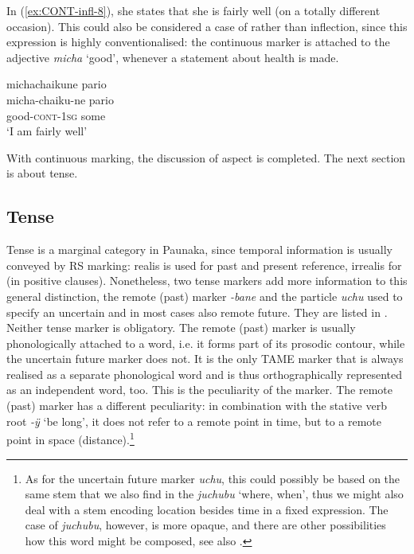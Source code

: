 In (\ref{ex:CONT-infl-8}), she states that she is fairly well (on a totally different occasion). This could also be considered a case of  rather than inflection, since this expression is highly conventionalised: the continuous marker is attached to the adjective \textit{micha} ‘good’, whenever a statement about health is made.

\ea\label{ex:CONT-infl-8}
\begingl
\glpreamble michachaikune pario\\
\gla micha-chaiku-ne pario\\
\glb good-\textsc{cont}-1\textsc{sg} some\\
\glft ‘I am fairly well’
\endgl
\trailingcitation{[cux-120410ls.020]}
\xe

With continuous marking, the discussion of aspect is completed. The next section is about tense.

\subsection{Tense}\label{sec:Tense}
\largerpage[-1]
Tense is a marginal category in Paunaka, since temporal information is usually conveyed by RS marking: realis is used for past and present reference, irrealis for  (in positive clauses). Nonetheless, two tense markers add more information to this general distinction, the remote (past) marker \textit{-bane} and the particle \textit{uchu} used to specify an uncertain and in most cases also remote future. They are listed in . Neither tense marker is obligatory. The remote (past) marker is usually phonologically attached to a word, i.e. it forms part of its prosodic contour, while the uncertain future marker does not. It is the only TAME marker that is always realised as a separate phonological word and is thus orthographically represented as an independent word, too. This is the peculiarity of the  marker. The remote (past) marker has a different peculiarity: in combination with the stative verb root \textit{-ÿ} ‘be long’, it does not refer to a remote point in time, but to a remote point in space (distance).\footnote{As for the uncertain future marker \textit{uchu}, this could possibly be based on the same stem that we also find in the  \textit{juchubu} ‘where, when’, thus we might also deal with a stem encoding location besides time in a fixed expression. The case of \textit{juchubu}, however, is more opaque, and there are other possibilities how this word might be composed, see also .}

